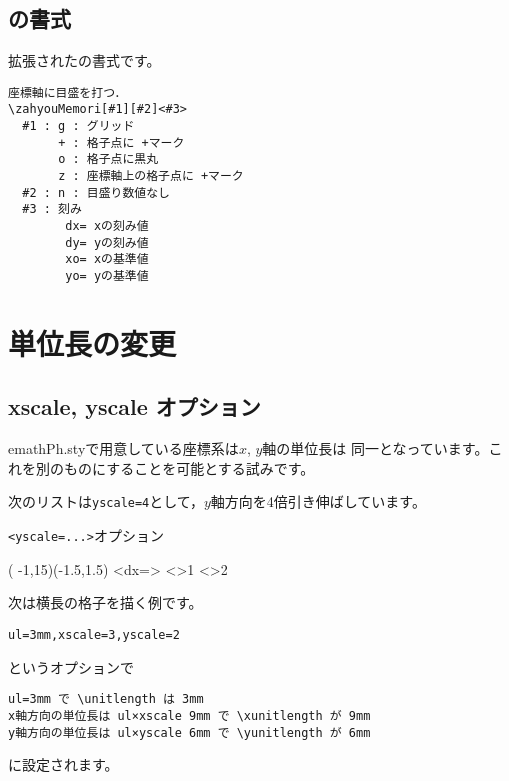 \documentclass[a4j]{jarticle}
\begin{document}
\subsection{の書式}
拡張されたの書式です。

\begin{boxnote}
\begin{verbatim}
座標軸に目盛を打つ．
\zahyouMemori[#1][#2]<#3>
  #1 : g : グリッド
       + : 格子点に +マーク
       o : 格子点に黒丸
       z : 座標軸上の格子点に +マーク
  #2 : n : 目盛り数値なし
  #3 : 刻み
        dx= xの刻み値
        dy= yの刻み値
        xo= xの基準値
        yo= yの基準値
\end{verbatim}
\end{boxnote}

\section{単位長の変更}
\subsection{xscale, yscale オプション}
\textsf{emathPh.sty}で用意している座標系は$x$, $y$軸の単位長は
同一となっています。これを別のものにすることを可能とする試みです。

次のリストは\verb/yscale=4/として，$y$軸方向を4倍引き伸ばしています。

\begin{showEx}{\texttt{<yscale=...>}オプション}
\begin{zahyou}[ul=3mm,yscale=4](%
  -1,15)(-1.5,1.5)
\zahyouMemori[z][n]<dx=\Pih>
\xMemori<>{1}
\xMemori<\pi>{2}
\end{zahyou}
\end{showEx}

次は横長の格子を描く例です。
\begin{jquote}
\begin{verbatim}
ul=3mm,xscale=3,yscale=2
\end{verbatim}
\end{jquote}
というオプションで
\begin{jquote}
\begin{verbatim}
ul=3mm で \unitlength は 3mm
x軸方向の単位長は ul×xscale 9mm で \xunitlength が 9mm
y軸方向の単位長は ul×yscale 6mm で \yunitlength が 6mm
\end{verbatim}
\end{jquote}
に設定されます。
\end{document}
